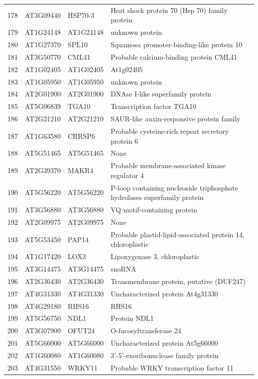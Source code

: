 \documentclass[11pt]{article}
\begin{document}
\begin{center}
\begin{tabular}{rlll}
178 & AT3G09440 & HSP70-3 & Heat shock protein 70 (Hsp 70) family protein\\
179 & AT1G24148 & AT1G24148 & unknown protein\\
180 & AT1G27370 & SPL10 & Squamosa promoter-binding-like protein 10\\
181 & AT3G50770 & CML41 & Probable calcium-binding protein CML41\\
182 & AT1G02405 & AT1G02405 & At1g02405\\
183 & AT1G05950 & AT1G05950 & unknown protein\\
184 & AT2G01900 & AT2G01900 & DNAse I-like superfamily protein\\
185 & AT5G06839 & TGA10 & Transcription factor TGA10\\
186 & AT2G21210 & AT2G21210 & SAUR-like auxin-responsive protein family\\
187 & AT1G63580 & CRRSP6 & Probable cysteine-rich repeat secretory protein 6\\
188 & AT5G51465 & AT5G51465 & None\\
189 & AT2G39370 & MAKR4 & Probable membrane-associated kinase regulator 4\\
190 & AT5G56220 & AT5G56220 & P-loop containing nucleoside triphosphate hydrolases superfamily protein\\
191 & AT3G56880 & AT3G56880 & VQ motif-containing protein\\
192 & AT2G09975 & AT2G09975 & None\\
193 & AT5G53450 & PAP14 & Probable plastid-lipid-associated protein 14, chloroplastic\\
194 & AT1G17420 & LOX3 & Lipoxygenase 3, chloroplastic\\
195 & AT3G14475 & AT3G14475 & snoRNA\\
196 & AT2G36430 & AT2G36430 & Transmembrane protein, putative (DUF247)\\
197 & AT4G31330 & AT4G31330 & Uncharacterized protein At4g31330\\
198 & AT4G29180 & RHS16 & RHS16\\
199 & AT5G56750 & NDL1 & Protein NDL1\\
200 & AT3G07900 & OFUT24 & O-fucosyltransferase 24\\
201 & AT5G66000 & AT5G66000 & Uncharacterized protein At5g66000\\
202 & AT1G60080 & AT1G60080 & 3'-5'-exoribonuclease family protein\\
203 & AT4G31550 & WRKY11 & Probable WRKY transcription factor 11\\

\end{tabular}
\end{center}
\end{document}
